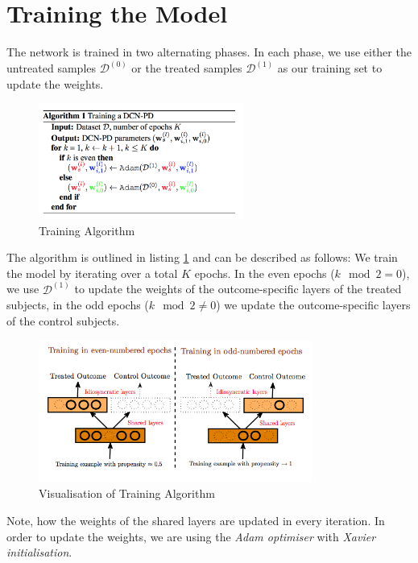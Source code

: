 \section{Training the Model}
The network is trained in two alternating phases. In each phase, we use either the untreated samples $\mathcal{D}^{(0)}$ or the treated samples $\mathcal{D}^{(1)}$ as our training set to update the weights. 
\begin{figure}[h]
	\centering
	\includegraphics[width=0.6\textwidth]{figures/chapter-3/training-algorithm.png}
	\caption{Training Algorithm}\label{fig:training-algorithm}
\end{figure}
The algorithm is outlined in listing \ref{fig:training-algorithm} and can be described as follows: We train the model by iterating over a total $K$ epochs. In the even epochs ($k \mod 2 = 0$), we use $\mathcal{D}^{(1)}$ to update the weights of the outcome-specific layers of the treated subjects, in the odd epochs ($k \mod 2 \neq 0$) we update the outcome-specific layers of the control subjects. 

\begin{figure}[h]
	\centering
	\includegraphics[width=0.8\textwidth]{figures/chapter-3/pbd-training.png}
	\caption{Visualisation of Training Algorithm}\label{fig:dcn-training}
\end{figure}


Note, how the weights of the shared layers are updated in every iteration. In order to update the weights, we are using the \emph{Adam optimiser} with \emph{Xavier initialisation}. %

